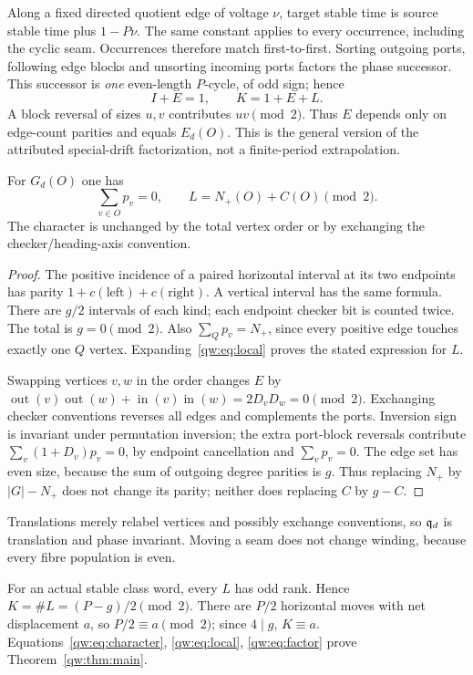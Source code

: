 Along a fixed directed quotient edge of voltage $\nu$, target stable time is
source stable time plus $1-P\nu$. The same constant applies to every occurrence,
including the cyclic seam. Occurrences therefore match first-to-first.
Sorting outgoing ports, following edge blocks and unsorting incoming ports
factors the phase successor. This successor is \emph{one} even-length $P$-cycle,
of odd sign; hence
\begin{equation}
 I+E=1,\qquad K=1+E+L.\label{qw:eq:factor}
\end{equation}
A block reversal of sizes $u,v$ contributes $uv\pmod2$. Thus $E$ depends only
on edge-count parities and equals $E_d(O)$. This is the general version of the
attributed special-drift factorization, not a finite-period extrapolation.

\begin{lemma}\label{qw:lem:cancel}
For $G_d(O)$ one has
\[
 \sum_{v\in O}p_v=0,\qquad L=N_+(O)+C(O)\pmod2.
\]
The character is unchanged by the total vertex order or by exchanging the
checker/heading-axis convention.
\end{lemma}
\begin{proof}
The positive incidence of a paired horizontal interval at its two endpoints
has parity $1+c(\text{left})+c(\text{right})$. A vertical interval has the same
formula. There are $g/2$ intervals of each kind; each endpoint checker bit is
counted twice. The total is $g=0\pmod2$.
Also $\sum_Qp_v=N_+$, since every positive edge touches exactly one $Q$ vertex.
Expanding~\eqref{qw:eq:local} proves the stated expression for $L$.

Swapping vertices $v,w$ in the order changes $E$ by
$\operatorname{out}(v)\operatorname{out}(w)+
\operatorname{in}(v)\operatorname{in}(w)=2D_vD_w=0\pmod2$.
Exchanging checker conventions reverses all edges and complements the ports.
Inversion sign is invariant under permutation inversion; the extra port-block
reversals contribute $\sum_v(1+D_v)p_v=0$, by endpoint cancellation and
$\sum_vp_v=0$. The edge set has even size, because the sum of outgoing degree
parities is $g$. Thus replacing $N_+$ by $|G|-N_+$ does not change its parity;
neither does replacing $C$ by $g-C$.
\end{proof}
Translations merely relabel vertices and possibly exchange conventions, so
$\mathfrak q_d$ is translation and phase invariant. Moving a seam does not change winding,
because every fibre population is even.

For an actual stable class word, every $L$ has odd rank. Hence
$K=\#L=(P-g)/2\pmod2$. There are $P/2$ horizontal moves with net displacement
$a$, so $P/2\equiv a\pmod2$; since $4\mid g$, $K\equiv a$.
Equations~\eqref{qw:eq:character}, \eqref{qw:eq:local}, \eqref{qw:eq:factor} prove
Theorem~\ref{qw:thm:main}.

